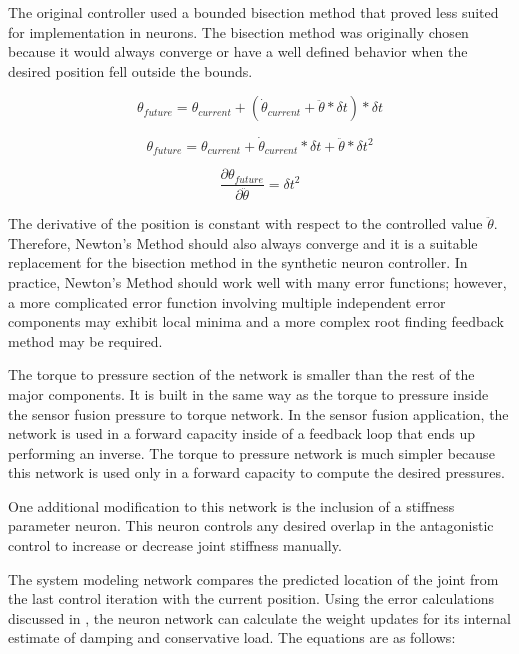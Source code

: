 The original 
controller used a bounded bisection method that proved less suited for 
implementation in neurons. The bisection method was originally chosen because
it would always converge or have a well defined behavior when the desired
position fell outside the bounds.

\begin{equation}
\theta_{future} = \theta_{current} + (\dot{\theta}_{current} + \ddot{\theta} * \delta t) * \delta t
\end{equation}

\begin{equation}
\theta_{future} = \theta_{current} + \dot{\theta}_{current} * \delta t + \ddot{\theta} * \delta t^{2}
\end{equation}

\begin{equation}
\dfrac{\partial \theta_{future}}{\partial \ddot{\theta}} = \delta t^{2}
\end{equation}

The derivative of the position is constant with respect to the controlled value
$\ddot{\theta}$. Therefore, Newton's Method should also always converge and it is a suitable replacement for the bisection method in the synthetic neuron
controller. In practice, Newton's Method should work well with many error functions; however,
a more complicated error function involving multiple independent error 
components may exhibit local minima and a more complex root finding feedback
method may be required.


The torque to pressure section of the network is smaller than the rest of the 
major components. It is built in the same way as the torque to pressure inside
the sensor fusion pressure to torque network. In the sensor fusion application,
the network is used in a forward capacity inside of a feedback loop that ends
up performing an inverse. The torque to pressure network is much simpler because this network
is used only in a forward capacity to compute the desired pressures.

One additional modification to this network is the inclusion of a stiffness
parameter neuron. This neuron controls any desired overlap in the antagonistic control
to increase or decrease joint stiffness manually.


The system modeling network compares the predicted location of the joint from 
the last control iteration with the current position. Using the error 
calculations discussed in , the neuron network
can calculate the weight updates for its internal estimate of damping and 
conservative load. The equations are as follows:

